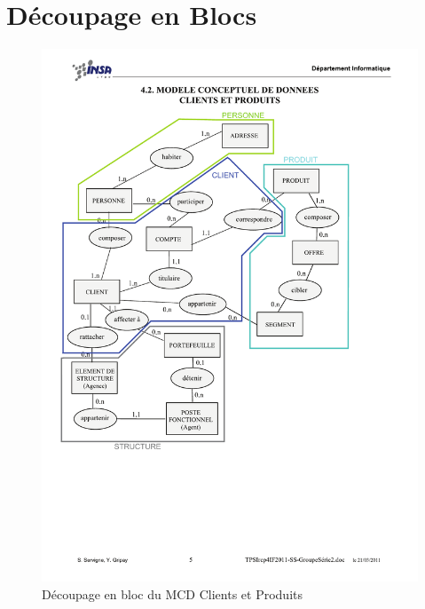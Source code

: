 \section{Découpage en Blocs}
\begin{figure}[H]
	\begin{center}
		\includegraphics[scale=0.8,clip, trim = 5mm 65mm 35mm 35mm]{Includes/SOA-Blocs-1.pdf}
		\caption{Découpage en bloc du MCD Clients et Produits}
	\end{center}
\end{figure}

